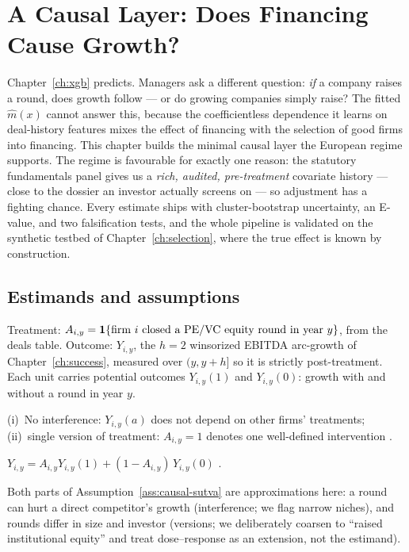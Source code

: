 \chapter{A Causal Layer: Does Financing Cause Growth?}
\label{ch:causal}

Chapter~\ref{ch:xgb} predicts. Managers ask a different question: \emph{if} a company
raises a round, does growth follow --- or do growing companies simply raise? The fitted
$\hat m(x)$ cannot answer this, because the coefficientless dependence it learns on
deal-history features mixes the effect of financing with the selection of good firms into
financing. This chapter builds the minimal causal layer the European regime supports. The
regime is favourable for exactly one reason: the statutory fundamentals panel gives us a
\emph{rich, audited, pre-treatment} covariate history --- close to the dossier an
investor actually screens on --- so adjustment has a fighting chance. Every estimate
ships with cluster-bootstrap uncertainty, an E-value, and two falsification tests, and
the whole pipeline is validated on the synthetic testbed of Chapter~\ref{ch:selection},
where the true effect is known by construction.

\section{Estimands and assumptions}
\label{sec:causal-estimands}

Treatment: $A_{i,y} = \mathbf{1}\{\text{firm } i \text{ closed a PE/VC equity round in year }
y\}$, from the deals table. Outcome: $Y_{i,y}$, the $h=2$ winsorized EBITDA arc-growth of
Chapter~\ref{ch:success}, measured over $(y, y+h]$ so it is strictly post-treatment.
Each unit carries potential outcomes $Y_{i,y}(1)$ and $Y_{i,y}(0)$: growth with and
without a round in year $y$.

\begin{assumption}[SUTVA]
\label{ass:causal-sutva}
(i)~No interference: $Y_{i,y}(a)$ does not depend on other firms' treatments;
(ii)~single version of treatment: $A_{i,y}=1$ denotes one well-defined intervention
\cite{imbens2015}.
\end{assumption}

\begin{assumption}[Consistency]
\label{ass:causal-consistency}
$Y_{i,y} = A_{i,y} Y_{i,y}(1) + (1 - A_{i,y})\, Y_{i,y}(0)$ \cite{hernan2020}.
\end{assumption}

Both parts of Assumption~\ref{ass:causal-sutva} are approximations here: a round can
hurt a direct competitor's growth (interference; we flag narrow niches), and rounds
differ in size and investor (versions; we deliberately coarsen to ``raised
institutional equity'' and treat dose--response as an extension, not the estimand).

